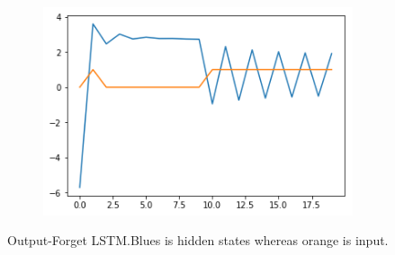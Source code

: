 \documentclass[12pt, letterpaper]{article}
\begin{document}
\begin{figure}[h]
\begin{subfigure}[b]{0.3\textwidth}
        \includegraphics[width=\textwidth]{fo3}
        \label{fig:mouse}
    \end{subfigure}
    \caption{Output-Forget LSTM.Blues is hidden states whereas orange is input.}\label{fig:animals}
\end{figure}
\end{document}
